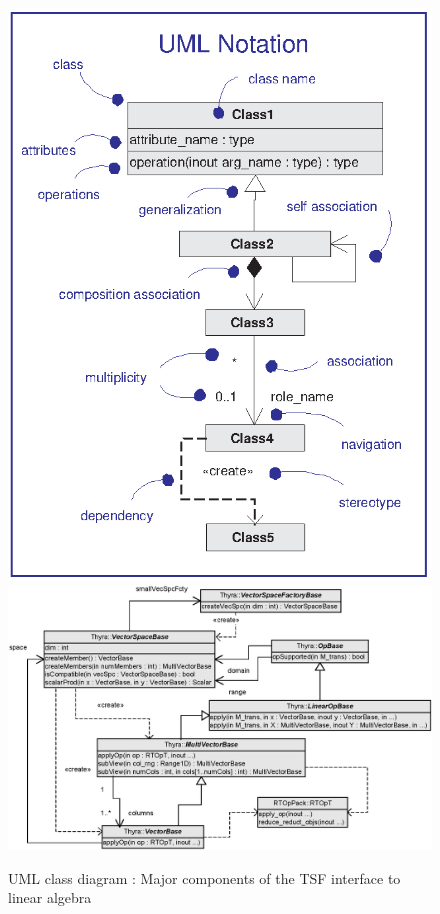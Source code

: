 \documentclass[pdf,ps2pdf,11pt]{SANDreport}
\begin{document}
{\bsinglespace
\begin{figure}[t]
\begin{center}
\includegraphics*[bb= 0.0in 0.0in 3.3in 4.4in,scale=0.40
]{UML1}
\includegraphics*[scale=0.65]{ThyraOperatorVector}
\end{center}
\caption{
\label{thyra:fig:basic_op_vec_itfc}
UML class diagram : Major components of the TSF
interface to linear algebra
}
\end{figure}
\esinglespace}
\end{document}
